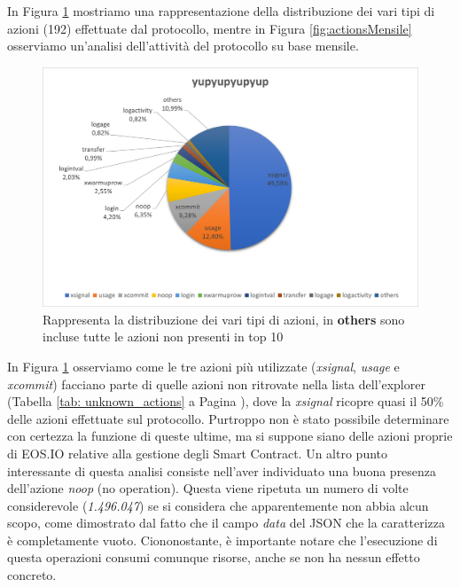 In Figura \ref{fig:actionsDistribution} mostriamo una rappresentazione della distribuzione dei vari tipi di azioni (192) effettuate dal protocollo, mentre in Figura \ref{fig:actionsMensile} osserviamo un'analisi dell'attività del protocollo su base mensile.

\begin{figure}[h!]
    \centering
    \includegraphics[width=1\textwidth]{graphs/torta_azioni.png}
    \caption{Rappresenta la distribuzione dei vari tipi di azioni, in \textbf{others} sono incluse tutte le azioni non presenti in top 10}
    \label{fig:actionsDistribution}
\end{figure}

In Figura \ref{fig:actionsDistribution} osserviamo come le tre azioni più utilizzate (\textit{xsignal}, \textit{usage} e \textit{xcommit}) facciano parte di quelle azioni non ritrovate nella lista dell'explorer (Tabella \ref{tab: unknown_actions} a Pagina \pageref{tab: unknown_actions}), dove la \textit{xsignal} ricopre quasi il 50\% delle azioni effettuate sul protocollo. Purtroppo non è stato possibile determinare con certezza la funzione di queste ultime, ma si suppone siano delle azioni proprie di EOS.IO relative alla gestione degli Smart Contract.
Un altro punto interessante di questa analisi consiste nell'aver individuato una buona presenza dell'azione \textit{noop} (no operation). Questa viene ripetuta un numero di volte considerevole (\textit{1.496.047}) se si considera che apparentemente non abbia alcun scopo, come dimostrato dal fatto che il campo \textit{data} del JSON che la caratterizza è completamente vuoto. Ciononostante, è importante notare che l'esecuzione di questa operazioni consumi comunque risorse, anche se non ha nessun effetto concreto.

